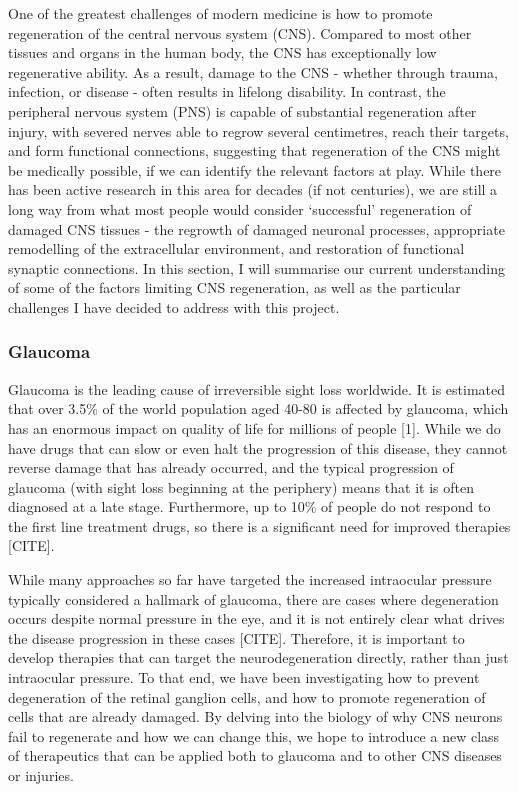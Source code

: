\documentclass[
  12pt,
  a4paper,
]{article}
\begin{document}
One of the greatest challenges of modern medicine is how to promote
regeneration of the central nervous system (CNS). Compared to most other
tissues and organs in the human body, the CNS has exceptionally low
regenerative ability. As a result, damage to the CNS - whether through
trauma, infection, or disease - often results in lifelong disability. In
contrast, the peripheral nervous system (PNS) is capable of substantial
regeneration after injury, with severed nerves able to regrow several
centimetres, reach their targets, and form functional connections,
suggesting that regeneration of the CNS might be medically possible, if
we can identify the relevant factors at play. While there has been
active research in this area for decades (if not centuries), we are
still a long way from what most people would consider `successful'
regeneration of damaged CNS tissues - the regrowth of damaged neuronal
processes, appropriate remodelling of the extracellular environment, and
restoration of functional synaptic connections. In this section, I will
summarise our current understanding of some of the factors limiting CNS
regeneration, as well as the particular challenges I have decided to
address with this project.

\hypertarget{glaucoma}{%
\subsubsection{Glaucoma}\label{glaucoma}}

Glaucoma is the leading cause of irreversible sight loss worldwide. It
is estimated that over 3.5\% of the world population aged 40-80 is
affected by glaucoma, which has an enormous impact on quality of life
for millions of people {[}1{]}. While we do have drugs that can slow or
even halt the progression of this disease, they cannot reverse damage
that has already occurred, and the typical progression of glaucoma (with
sight loss beginning at the periphery) means that it is often diagnosed
at a late stage. Furthermore, up to 10\% of people do not respond to the
first line treatment drugs, so there is a significant need for improved
therapies {[}CITE{]}.

While many approaches so far have targeted the increased intraocular
pressure typically considered a hallmark of glaucoma, there are cases
where degeneration occurs despite normal pressure in the eye, and it is
not entirely clear what drives the disease progression in these cases
{[}CITE{]}. Therefore, it is important to develop therapies that can
target the neurodegeneration directly, rather than just intraocular
pressure. To that end, we have been investigating how to prevent
degeneration of the retinal ganglion cells, and how to promote
regeneration of cells that are already damaged. By delving into the
biology of why CNS neurons fail to regenerate and how we can change
this, we hope to introduce a new class of therapeutics that can be
applied both to glaucoma and to other CNS diseases or injuries.
\end{document}
